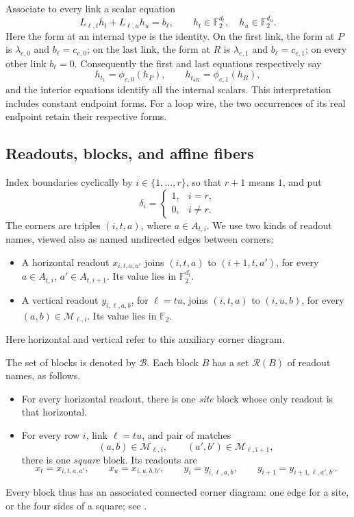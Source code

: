 \documentclass[11pt]{article}
\theoremstyle{definition}
\newcommand{\F}{\mathbb F_2}
\newcommand{\cB}{\mathcal B}
\newcommand{\cR}{\mathcal R}
\newcommand{\cM}{\mathcal M}
\begin{document}
Associate to every link a scalar equation
\begin{equation}
   L_{\ell,t}h_t+L_{\ell,u}h_u=b_\ell,
   \qquad h_t\in\F^{d_t},\quad h_u\in\F^{d_u}.
   \label{eq:link-equation}
\end{equation}
Here the form at an internal type is the identity. On the first link,
the form at \(P\) is \(\lambda_{e,0}\) and \(b_\ell=c_{e,0}\);
on the last link, the form at \(R\) is \(\lambda_{e,1}\) and
\(b_\ell=c_{e,1}\); on every other link \(b_\ell=0\).
Consequently the first and last equations respectively say
\[
 h_{t_1}=\phi_{e,0}(h_P),
 \qquad
 h_{t_{4K}}=\phi_{e,1}(h_R),
\]
and the interior equations identify all the internal scalars.
This interpretation includes constant endpoint forms. For a loop wire,
the two occurrences of its real endpoint retain their respective forms.

\subsection{Readouts, blocks, and affine fibers}
\label{offset:blocks}

Index boundaries cyclically by \(i\in\{1,\ldots,r\}\), so that \(r+1\)
means \(1\), and put
\[
 \delta_i=
 \begin{cases}
  1,&i=r,\\
  0,&i\ne r.
 \end{cases}
\]
The corners are triples \((i,t,a)\), where \(a\in A_{t,i}\).
We use two kinds of readout names, viewed also as named undirected edges
between corners:
\begin{itemize}
 \item A horizontal readout \(x_{i,t,a,a'}\) joins
 \((i,t,a)\) to \((i+1,t,a')\), for every
 \(a\in A_{t,i}\), \(a'\in A_{t,i+1}\). Its value lies in \(\F^{d_t}\).
 \item A vertical readout \(y_{i,\ell,a,b}\), for \(\ell=tu\), joins
 \((i,t,a)\) to \((i,u,b)\), for every
 \((a,b)\in\cM_{\ell,i}\). Its value lies in \(\F\).
\end{itemize}
Here horizontal and vertical refer to this auxiliary corner diagram.

The set of blocks is denoted by \(\cB\). Each block \(B\) has a set
\(\cR(B)\) of readout names, as follows.
\begin{itemize}
 \item For every horizontal readout, there is one \emph{site} block whose
 only readout is that horizontal.
 \item For every row \(i\), link \(\ell=tu\), and pair of matches
 \[
   (a,b)\in\cM_{\ell,i},\qquad
   (a',b')\in\cM_{\ell,i+1},
 \]
 there is one \emph{square} block. Its readouts are
 \[
  x_t=x_{i,t,a,a'},\qquad x_u=x_{i,u,b,b'},\qquad
  y_i=y_{i,\ell,a,b},\qquad
  y_{i+1}=y_{i+1,\ell,a',b'}.
 \]
\end{itemize}
Every block thus has an associated connected corner diagram: one edge for
a site, or the four sides of a square; see .
\end{document}
